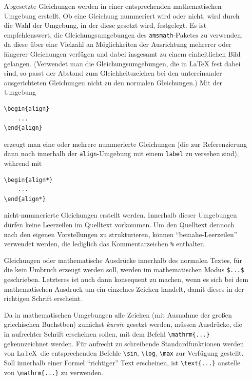 Abgesetzte Gleichungen werden in einer entsprechenden mathematischen Umgebung erstellt.
Ob eine Gleichung nummeriert wird oder nicht, wird durch die Wahl der Umgebung, in der diese gesetzt wird, festgelegt.
Es ist empfehlenswert, die Gleichungsumgebungen des \verb|amsmath|-Paketes zu verwenden, da diese über eine Vielzahl an Möglichkeiten der Ausrichtung mehrerer oder längerer Gleichungen verfügen und dabei insgesamt zu einem einheitlichen Bild gelangen.
(Verwendet man die Gleichungsumgebungen, die in \LaTeX{} fest dabei sind, so passt der Abstand zum Gleichheitszeichen bei den untereinander ausgerichteten Gleichungen nicht zu den normalen Gleichungen.)
Mit der Umgebung
\begin{verbatim}
\begin{align}
    ...
\end{align}
\end{verbatim}
erzeugt man eine oder mehrere nummerierte Gleichungen (die zur Referenzierung dann noch innerhalb der \verb|align|-Umgebung mit einem \verb|label| zu versehen sind), während mit
\begin{verbatim}
\begin{align*}
    ...
\end{align*}
\end{verbatim}
nicht-nummerierte Gleichungen erstellt werden.
Innerhalb dieser Umgebungen dürfen keine Leerzeilen im Quelltext vorkommen. Um den Quelltext dennoch nach den eigenen Vorstellungen zu strukturieren, können "`beinahe-Leerzeilen"' verwendet werden, die lediglich das Kommentarzeichen \verb|%| enthalten.


Gleichungen oder mathematische Ausdrücke innerhalb des normalen Textes, für die kein Umbruch erzeugt werden soll, werden im mathematischen Modus \verb|$...$| geschrieben.
Letzteres ist auch dann konsequent zu machen, wenn es sich bei dem mathematischen Ausdruck um ein einzelnes Zeichen handelt, damit dieses in der richtigen Schrift erscheint.

Da in mathematischen Umgebungen alle Zeichen (mit Ausnahme der großen griechischen Buchstben) zunächst \emph{kursiv} gesetzt werden, müssen Ausdrücke, die in aufrechter Schrift erscheinen sollen, mit dem Befehl \verb|\mathrm{...}| gekennzeichnet werden.
Für aufrecht zu schreibende Standardfunktionen werden von \LaTeX\ die entsprechenden Befehle \verb|\sin|, \verb|\log|, \verb|\max| \usw zur Verfügung gestellt.
Soll innerhalb einer Formel "`richtiger"' Text erscheinen, ist \verb|\text{...}| anstelle von \verb|\mathrm{...}| zu verwenden.

